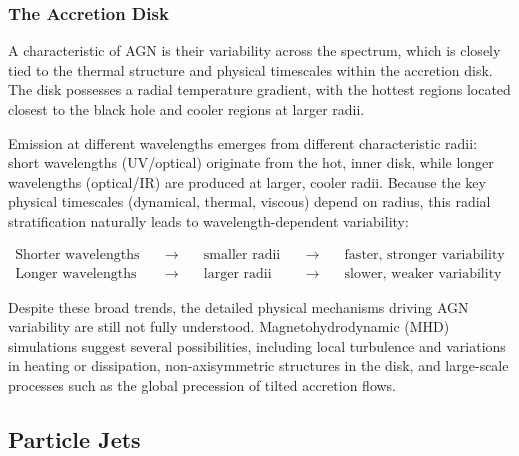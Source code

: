 \subsubsection{The Accretion Disk}

A characteristic of AGN is their variability across the spectrum, which is closely tied to the thermal structure and physical timescales within the accretion disk. The disk possesses a radial temperature gradient, with the hottest regions located closest to the black hole and cooler regions at larger radii.

Emission at different wavelengths emerges from different characteristic radii: short wavelengths (UV/optical) originate from the hot, inner disk, while longer wavelengths (optical/IR) are produced at larger, cooler radii. Because the key physical timescales (dynamical, thermal, viscous) depend on radius, this radial stratification naturally leads to wavelength-dependent variability:

$$
\begin{array}{ccccc}
    \text{Shorter wavelengths} & \quad \rightarrow \quad & \text{smaller radii} & \quad \rightarrow \quad & \text{faster, stronger variability} \\
    \text{Longer wavelengths} & \quad \rightarrow \quad & \text{larger radii} & \quad \rightarrow \quad & \text{slower, weaker variability}
\end{array}
$$

\smallskip

Despite these broad trends, the detailed physical mechanisms driving AGN variability are still not fully understood. Magnetohydrodynamic (MHD) simulations suggest several possibilities, including local turbulence and variations in heating or dissipation, non-axisymmetric structures in the disk, and large-scale processes such as the global precession of tilted accretion flows.

\subsection{Particle Jets} \label{subsec:agn_jets_disk}

\vspace{-0.3em}

